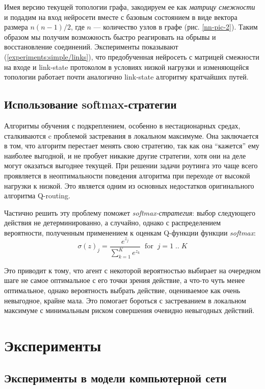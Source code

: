 \documentclass[specification, annotation]{itmo-student-thesis}
\begin{document}
Имея версию текущей топологии графа, закодируем ее как \textit{матрицу
  смежности} и подадим на вход нейросети вместе с базовым состоянием в виде
вектора размера $n(n-1)/2$, где $n$ --- количество узлов в графе (рис.
\ref{nn-pic-2}). Таким образом мы получим возможность быстро реагировать на
обрывы и восстановление соединений. Эксперименты показывают
(\ref{experiments:simple/links}), что предобученная нейросеть с матрицей
смежности на входе и link-state протоколом в условиях низкой нагрузки и
изменяющейся топологии работает почти аналогично link-state алгоритму кратчайших
путей.

\section{Использование softmax-стратегии}

Алгоритмы обучения с подкреплением, особенно в нестационарных средах,
сталкиваются c проблемой застревания в локальном максимуме. Она заключается в
том, что алгоритм перестает менять свою стратегию, так как она ``кажется'' ему
наиболее выгодной, и не пробует никакие другие стратегии, хотя они на деле могут
оказаться выгоднее текущей. При решении задачи роутинга это чаще всего
проявляется в неоптимальности поведения алгоритма при переходе от высокой
нагрузки к низкой. Это является одним из основных недостатков оригинального
алгоритма Q-routing.

Частично решить эту проблему поможет \textit{softmax-стратегия}: выбор
следующего действия не детерминированно, а случайно, однако с распределением
вероятности, полученным применением к оценкам Q-функции функции
\textit{softmax}:
\[
\sigma(z)_j = \frac{e^{z_j}}{\sum_{k=1}^K {e^{z_k}}} \; \; \mathrm{for} \; \; j
= 1 \; .. \; K
\]

Это приводит к тому, что агент с некоторой вероятностью выбирает на очередном
шаге не самое оптимальное с его точки зрения действие, а что-то чуть менее
оптимальное, однако вероятность выбрать действие, оцениваемое как очень
невыгодное, крайне мала. Это помогает бороться с застреванием в локальном
максимуме с минимальным риском совершения очевидно невыгодных действий.

\chapter{Эксперименты}

\section{Эксперименты в модели компьютерной сети}\label{experiments:simple}
\end{document}
